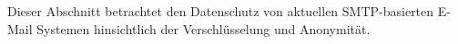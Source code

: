 Dieser Abschnitt betrachtet den Datenschutz von aktuellen SMTP-basierten E-Mail Systemen hinsichtlich der Verschlüsselung und Anonymität.